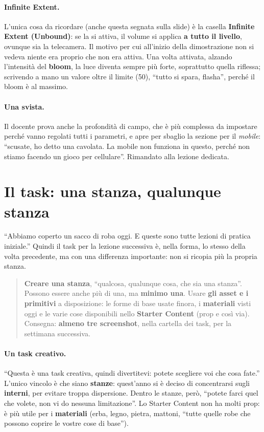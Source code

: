 \paragraph{Infinite Extent.} L'unica cosa da ricordare (anche questa segnata
sulla slide) è la casella \textbf{Infinite Extent (Unbound)}: se la si attiva,
il volume si applica \textbf{a tutto il livello}, ovunque sia la telecamera. Il
motivo per cui all'inizio della dimostrazione non si vedeva niente era proprio
che non era attiva. Una volta attivata, alzando l'intensità del \textbf{bloom},
la luce diventa sempre più forte, soprattutto quella riflessa; scrivendo a mano
un valore oltre il limite (50), ``tutto si spara, flasha'', perché il bloom è al
massimo.

\paragraph{Una svista.} Il docente prova anche la profondità di campo, che è più
complessa da impostare perché vanno regolati tutti i parametri, e apre per
sbaglio la sezione per il \emph{mobile}: ``scusate, ho detto una cavolata. La
mobile non funziona in questo, perché non stiamo facendo un gioco per
cellulare''. Rimandato alla lezione dedicata.

\section{Il task: una stanza, qualunque stanza}
\label{gd11:sec:task}

``Abbiamo coperto un sacco di roba oggi. E queste sono tutte lezioni di pratica
iniziale.'' Quindi il task per la lezione successiva è, nella forma, lo stesso
della volta precedente, ma con una differenza importante: non si ricopia più la
propria stanza.

\begin{quote}
\textbf{Creare una stanza}, ``qualcosa, qualunque cosa, che sia una stanza''.
Possono essere anche più di una, ma \textbf{minimo una}. Usare \textbf{gli asset
e i primitivi} a disposizione: le forme di base usate finora, i
\textbf{materiali} visti oggi e le varie cose disponibili nello
\textbf{Starter Content} (prop e così via). Consegna: \textbf{almeno tre
screenshot}, nella cartella dei task, per la settimana successiva.
\end{quote}

\paragraph{Un task creativo.} ``Questa è una task creativa, quindi divertitevi:
potete scegliere voi che cosa fate.'' L'unico vincolo è che siano
\textbf{stanze}: quest'anno si è deciso di concentrarsi sugli \textbf{interni},
per evitare troppa dispersione. Dentro le stanze, però, ``potete farci quel che
volete, non vi do nessuna limitazione''. Lo Starter Content non ha molti prop: è
più utile per i \textbf{materiali} (erba, legno, pietra, mattoni, ``tutte quelle
robe che possono coprire le vostre cose di base'').

